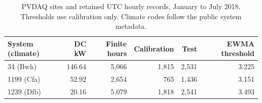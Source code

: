 \begin{table}[tb]\centering\small
\caption{PVDAQ sites and retained UTC hourly records, January to July 2018. Thresholds use calibration only. Climate codes follow the public system metadata.}\label{tab:sites}
\begin{tabular}{@{}lrrrrr@{}}\toprule
System (climate) & DC kW & Finite hours & Calibration & Test & EWMA threshold\\\midrule
34 (Bwh) & 146.64 & 5,066 & 1,815 & 2,531 & 3.225\\
1199 (Cfa) & 52.92 & 2,654 & 765 & 1,436 & 3.151\\
1239 (Dfb) & 20.16 & 5,079 & 1,818 & 2,541 & 3.493\\
\bottomrule\end{tabular}\end{table}
